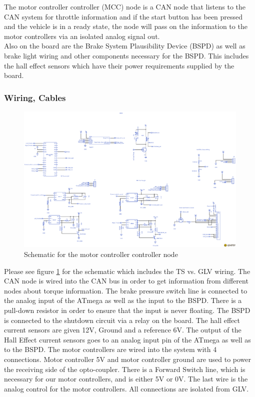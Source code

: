 \documentclass{article}
\begin{document}
        The motor controller controller (MCC) node is a CAN node that listens to the CAN system for throttle information and if the start button has been pressed and the vehicle is in a ready state, the node will pass on the information to the motor controllers via an isolated analog signal out.\\

            Also on the board are the Brake System Plausibility Device (BSPD) as well as brake light wiring and other components necessary for the BSPD. This includes the hall effect sensors which have their power requirements supplied by the board.\\


        \subsubsection{Wiring, Cables}

        \begin{figure}
            \includegraphics[width=\textheight]{mccschem}
            \caption{Schematic for the motor controller controller node}
            \label{mccschem}
        \end{figure}

        Please see figure \ref{mccschem} for the schematic which includes the TS vs. GLV wiring. The CAN node is wired into the CAN bus in order to get information from different nodes about torque information. The brake pressure switch line is connected to the analog input of the ATmega as well as the input to the BSPD. There is a pull-down resistor in order to ensure that the input is never floating. The BSPD is connected to the shutdown circuit via a relay on the board. The hall effect current sensors are given 12V, Ground and a reference 6V. The output of the Hall Effect current sensors goes to an analog input pin of the ATmega as well as to the BSPD. The motor controllers are wired into the system with 4 connections. Motor controller 5V and motor controller ground are used to power the receiving side of the opto-coupler. There is a Forward Switch line, which is necessary for our motor controllers, and is either 5V or 0V. The last wire is the analog control for the motor controllers. All connections are isolated from GLV.\\
\end{document}
